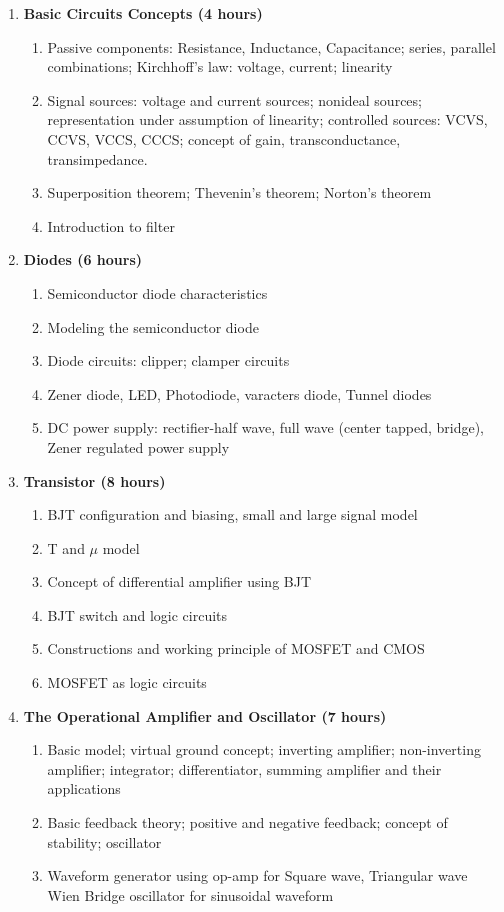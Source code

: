 \begin{enumerate}
    \item \textbf{Basic Circuits Concepts \hfill (4 hours)}
    \begin{enumerate}
        \item Passive components: Resistance, Inductance, Capacitance; series, parallel combinations; Kirchhoff's law: voltage, current; linearity
        \item Signal sources: voltage and current sources; nonideal sources; representation under assumption of linearity; controlled sources: VCVS, CCVS, VCCS, CCCS; concept of gain, transconductance, transimpedance.
        \item Superposition theorem; Thevenin's theorem; Norton's theorem
        \item Introduction to filter
    \end{enumerate}
    
    \item \textbf{Diodes \hfill (6 hours)}
    \begin{enumerate}
        \item Semiconductor diode characteristics
        \item Modeling the semiconductor diode
        \item Diode circuits: clipper; clamper circuits
        \item Zener diode, LED, Photodiode, varacters diode, Tunnel diodes
        \item DC power supply: rectifier-half wave, full wave (center tapped, bridge), Zener regulated power supply
    \end{enumerate}
    
    \item \textbf{Transistor \hfill (8 hours)}
    \begin{enumerate}
        \item BJT configuration and biasing, small and large signal model
        \item T and $\mu$ model
        \item Concept of differential amplifier using BJT
        \item BJT switch and logic circuits
        \item Constructions and working principle of MOSFET and CMOS
        \item MOSFET as logic circuits
    \end{enumerate}
    
    \item \textbf{The Operational Amplifier and Oscillator \hfill (7 hours)}
    \begin{enumerate}
        \item Basic model; virtual ground concept; inverting amplifier; non-inverting amplifier; integrator; differentiator, summing amplifier and their applications 
        \item Basic feedback theory; positive and negative feedback; concept of stability; oscillator
        \item Waveform generator using op-amp for Square wave, Triangular wave Wien Bridge oscillator for sinusoidal waveform
        

\end{enumerate}
\end{enumerate}
